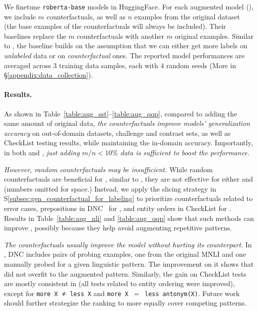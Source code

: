 We finetune \texttt{roberta-base} models in HuggingFace.
For each augmented model (\maug), we include $m$ counterfactuals, as well as $n$ examples from the original dataset (the base examples of the counterfactuals will always be included).
Their baselines \mcomp replace the $m$ counterfactuals with another $m$ original examples.
Similar to \citet{Khashabi2020MoreBF}, the baseline builds on the assumption that we can either get more labels on \emph{unlabeled} data or on \emph{counterfactual} ones.
The reported model performances are averaged across 3 training data samples, each with 4 random seeds (More in \S\ref{appendix:data_collection}).

\paragraph{Results.}
As shown in Table~\ref{table:aug_sst}--\ref{table:aug_qqp}, compared to adding the same amount of original data, \emph{the counterfactuals improve models' generalization accuracy} on out-of-domain datasets, challenge and contrast sets, as well as CheckList testing results, while maintaining the in-domain accuracy.
Importantly, in both \nli and \qqp, \emph{just adding $m/n < 10\%$ data is sufficient to boost the performance.}

\TableAugQQP


\emph{However, random counterfactuals may be insufficient.}
While random counterfactuals are beneficial for \sst, similar to \citet{huang2020counterfactually}, they are not effective for either \nli and \qqp (numbers omitted for space.)
Instead, we apply the slicing strategy in S\ref{subsec:gen_counterfactual_for_labeling} to prioritize counterfactuals related to error cases, \eg prepositions in DNC~\cite{kim2019probing} for \nli, and entity orders in CheckList for \qqp.
Results in Table~\ref{table:aug_nli} and \ref{table:aug_qqp} show that such methods can improve \maug, possibly because they help avoid augmenting repetitive patterns.

\emph{The counterfactuals usually improve the model without hurting its counterpart.}
In \nli, DNC includes pairs of probing examples, one from the original MNLI and one manually probed for a given linguistic pattern.
The improvement on it shows that \maug did not overfit to the augmented pattern.
Similarly, the gain on CheckList tests are mostly consistent in \qqp (\eg all tests related to entity ordering were improved), except for \texttt{more X $\not\eq$ less X} and \texttt{more X $=$ less antonym(X)}.
Future work should further strategize the ranking to more equally cover competing patterns. 


